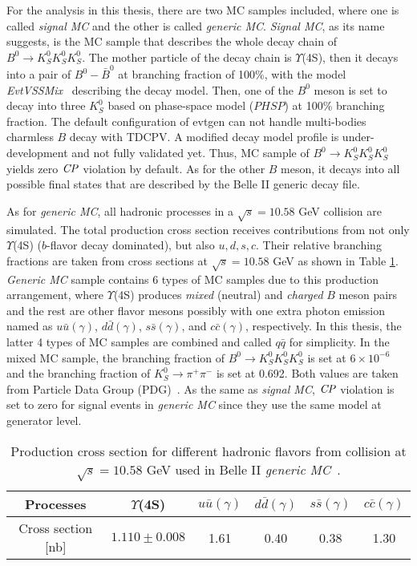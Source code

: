  For the analysis in this thesis, there are two MC samples included, where one is called \textit{signal MC} and the other is called \textit{generic MC}. \textit{Signal MC}, as its name suggests, is the MC sample that describes the whole decay chain of $B^0 \to K_S^0  K_S^0  K_S^0$. The mother particle of the decay chain is $\Upsilon$(4S), then it decays into a pair of $B^0-\bar{B}^0$ at branching fraction of 100\%, with the model \textit{EvtVSSMix}~\cite{evtgen} describing the decay model. Then, one of the $B^0$ meson is set to decay into three $K_S^0$ based on phase-space model ($PHSP$) at 100\% branching fraction. The default configuration of evtgen can not handle multi-bodies charmless $B$ decay with TDCPV. A modified decay model profile is under-development and not fully validated yet. Thus, MC sample of $B^0 \to K_S^0  K_S^0  K_S^0$ yields zero $\it{CP}$ violation by default. As for the other $B$ meson, it decays into all possible final states that are described by the Belle II generic decay file. 
 
 As for \textit{generic MC}, all hadronic processes in a  $\sqrt{s} = 10.58 $ GeV collision are simulated. The total production cross section receives contributions from not only $\Upsilon$(4S) ($b$-flavor decay dominated), but also $u, d, s, c$. 
 Their relative branching fractions are taken from cross sections at  $\sqrt{s} = 10.58 $ GeV as shown in Table \ref{tab:generic_br}. \textit{Generic MC} sample contains 6 types of MC samples due to this production arrangement, where $\Upsilon$(4S) produces \textit{mixed} (neutral) and \textit{charged} $B$ meson pairs and the rest are other flavor mesons possibly with one extra photon emission named as $u\bar{u}(\gamma)$, $d\bar{d}(\gamma)$, $s\bar{s}(\gamma)$, and $c\bar{c}(\gamma)$, respectively. In this thesis, the latter 4 types of MC samples are combined and called $q\bar{q}$ for simplicity. In the mixed MC sample, the branching fraction of $B^0 \to K_S^0  K_S^0  K_S^0$ is set at $6 \times 10^{-6}$ and the branching fraction of $K_S^0 \to \pi^{+}\pi^{-}$ is set at 0.692. Both values are taken from Particle Data Group (PDG)~\cite{pdg}. As the same as \textit{signal MC}, $\it{CP}$ violation is set to zero for signal events in \textit{generic MC} since they use the same model at generator level.
 
 \begin{table}
 	\caption{Production cross section for different hadronic flavors from collision at  $\sqrt{s} = 10.58 $ GeV used in Belle II \textit{generic MC}~\cite{b2book}.}
 	\label{tab:generic_br}
 	\centering
 	\begin{tabular}{c|c|c|c|c|c}
 		\hline 
 	Processes & $\Upsilon$(4S) & $u\bar{u}(\gamma)$ & $d\bar{d}(\gamma)$ & $s\bar{s}(\gamma)$ & $c\bar{c}(\gamma)$ \\
 		\hline 
 	Cross section [nb] & $1.110\pm0.008$ & 1.61 & 0.40 & 0.38 & 1.30 \\
 	\hline
 	\end{tabular}
 \end{table}
 
